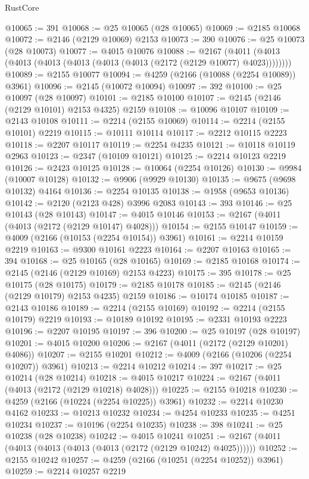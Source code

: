\begin{lexlean}{RustCore}
\begin{coremodule}
@10065 := 391
@10068 := @25 @10065 (@28 @10065)
@10069 := @2185 @10068
@10072 := @2146 (@2129 @10069) @2153
@10073 := 390
@10076 := @25 @10073 (@28 @10073)
@10077 := @4015 @10076
@10088 := @2167 (@4011 (@4013 (@4013 (@4013 (@4013 (@4013 (@4013 (@2172 (@2129 @10077) @4023))))))))
@10089 := @2155 @10077
@10094 := @4259 (@2166 (@10088 (@2254 @10089)) @3961)
@10096 := @2145 (@10072 @10094)
@10097 := 392
@10100 := @25 @10097 (@28 @10097)
@10101 := @2185 @10100
@10107 := @2145 (@2146 (@2129 @10101) @2153 @4325) @2159
@10108 := @10096 @10107
@10109 := @2143 @10108
@10111 := @2214 (@2155 @10069)
@10114 := @2214 (@2155 @10101) @2219
@10115 := @10111 @10114
@10117 := @2212 @10115 @2223
@10118 := @2207 @10117
@10119 := @2254 @4235
@10121 := @10118 @10119 @2963
@10123 := @2347 (@10109 @10121)
@10125 := @2214 @10123 @2219
@10126 := @2423 @10125
@10128 := @10064 (@2254 @10126)
@10130 := @9984 (@10007 @10128)
@10132 := @9906 (@9929 @10130)
@10135 := @9675 (@9698 @10132) @4164
@10136 := @2254 @10135
@10138 := @1958 (@9653 @10136)
@10142 := @2120 (@2123 @428) @3996 @2083
@10143 := 393
@10146 := @25 @10143 (@28 @10143)
@10147 := @4015 @10146
@10153 := @2167 (@4011 (@4013 (@2172 (@2129 @10147) @4028)))
@10154 := @2155 @10147
@10159 := @4009 (@2166 (@10153 (@2254 @10154)) @3961)
@10161 := @2214 @10159 @2219
@10163 := @9300 @10161 @2223
@10164 := @2207 @10163
@10165 := 394
@10168 := @25 @10165 (@28 @10165)
@10169 := @2185 @10168
@10174 := @2145 (@2146 (@2129 @10169) @2153 @4223)
@10175 := 395
@10178 := @25 @10175 (@28 @10175)
@10179 := @2185 @10178
@10185 := @2145 (@2146 (@2129 @10179) @2153 @4235) @2159
@10186 := @10174 @10185
@10187 := @2143 @10186
@10189 := @2214 (@2155 @10169)
@10192 := @2214 (@2155 @10179) @2219
@10193 := @10189 @10192
@10195 := @2331 @10193 @2223
@10196 := @2207 @10195
@10197 := 396
@10200 := @25 @10197 (@28 @10197)
@10201 := @4015 @10200
@10206 := @2167 (@4011 (@2172 (@2129 @10201) @4086))
@10207 := @2155 @10201
@10212 := @4009 (@2166 (@10206 (@2254 @10207)) @3961)
@10213 := @2214 @10212
@10214 := 397
@10217 := @25 @10214 (@28 @10214)
@10218 := @4015 @10217
@10224 := @2167 (@4011 (@4013 (@2172 (@2129 @10218) @4028)))
@10225 := @2155 @10218
@10230 := @4259 (@2166 (@10224 (@2254 @10225)) @3961)
@10232 := @2214 @10230 @4162
@10233 := @10213 @10232
@10234 := @4254 @10233
@10235 := @4251 @10234
@10237 := @10196 (@2254 @10235)
@10238 := 398
@10241 := @25 @10238 (@28 @10238)
@10242 := @4015 @10241
@10251 := @2167 (@4011 (@4013 (@4013 (@4013 (@4013 (@2172 (@2129 @10242) @4025))))))
@10252 := @2155 @10242
@10257 := @4259 (@2166 (@10251 (@2254 @10252)) @3961)
@10259 := @2214 @10257 @2219

\end{coremodule}
\end{lexlean}
